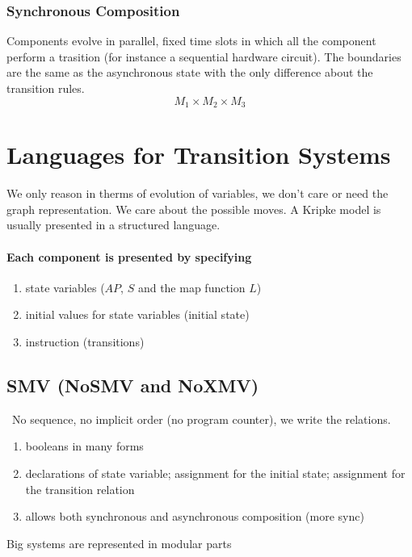 \documentclass[11pt]{article}
\begin{document}
\subsubsection{Synchronous Composition} %
\label{ssub:synchronous_composition}
Components evolve in parallel, fixed time slots in which all the component perform a trasition (for instance a sequential hardware circuit).
The boundaries are the same as the asynchronous state with the only difference about the transition rules.
\[
	M_1 \times M_2 \times M_3
\]



\section{Languages for Transition Systems} %
\label{sec:languages_for_transition_systems}

We only reason in therms of evolution of variables, we don't care or need the graph representation. We care about the possible moves.
A Kripke model is usually presented in a structured language.
\paragraph{Each component is presented by specifying} %
\label{par:each_component_is_presented_by_specifying}
\begin{enumerate}
	\item state variables ($AP$, $S$ and the map function $L$)
	\item initial values for state variables (initial state)
	\item instruction (transitions)
\end{enumerate}
\subsection{SMV (NoSMV and NoXMV)} %
\label{sub:smv}\
No sequence, no implicit order (no program counter), we write the relations.
\begin{enumerate}
	\item booleans in many forms
	\item declarations of state variable; assignment for the initial state; assignment for the transition relation
	\item allows both synchronous and asynchronous composition (more sync)
\end{enumerate}
Big systems are represented in modular parts
\end{document}
